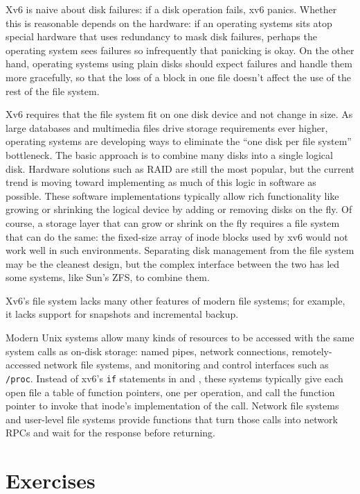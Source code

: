 Xv6 is naive about disk failures: if a disk
operation fails, xv6 panics.
Whether this is reasonable depends on the hardware:
if an operating systems sits atop special hardware that uses
redundancy to mask disk failures, perhaps the operating system
sees failures so infrequently that panicking is okay.
On the other hand, operating systems using plain disks
should expect failures and handle them more gracefully,
so that the loss of a block in one file doesn't affect the
use of the rest of the file system.

Xv6 requires that the file system
fit on one disk device and not change in size.
As large databases and multimedia files drive storage
requirements ever higher, operating systems are developing ways
to eliminate the ``one disk per file system'' bottleneck.
The basic approach is to combine many disks into a single
logical disk.  Hardware solutions such as RAID are still the 
most popular, but the current trend is moving toward implementing
as much of this logic in software as possible.
These software implementations typically 
allow rich functionality like growing or shrinking the logical
device by adding or removing disks on the fly.
Of course, a storage layer that can grow or shrink on the fly
requires a file system that can do the same: the fixed-size array
of inode blocks used by xv6 would not work well
in such environments.
Separating disk management from the file system may be
the cleanest design, but the complex interface between the two
has led some systems, like Sun's ZFS, to combine them.

Xv6's file system lacks many other features of modern file systems; for example,
it lacks support for snapshots and incremental backup.

Modern Unix systems allow many kinds of resources to be
accessed with the same system calls as on-disk storage:
named pipes, network connections,
remotely-accessed network file systems, and monitoring and control
interfaces such as
\lstinline{/proc}.
Instead of xv6's
\lstinline{if}
statements in
and
,
these systems typically give each open file a table of function pointers,
one per operation,
and call the function pointer to invoke that inode's
implementation of the call.
Network file systems and user-level file systems 
provide functions that turn those calls into network RPCs
and wait for the response before returning.
\section{Exercises}

